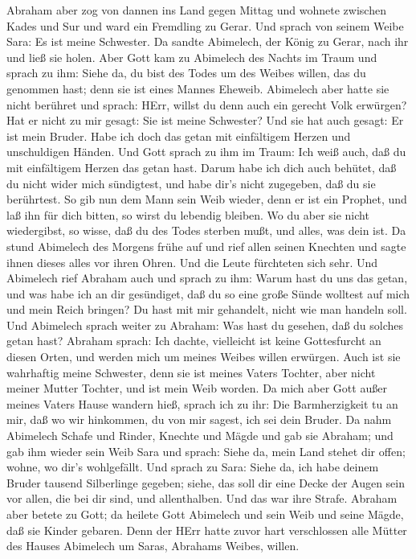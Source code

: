  Abraham aber zog von dannen ins Land gegen Mittag und
wohnete zwischen Kades und Sur und ward ein Fremdling zu Gerar.
 Und sprach von seinem Weibe Sara: Es ist meine Schwester.
Da sandte Abimelech, der König zu Gerar, nach ihr und ließ sie holen.
 Aber Gott kam zu Abimelech des Nachts im Traum und sprach
zu ihm: Siehe da, du bist des Todes um des Weibes willen, das du
genommen hast; denn sie ist eines Mannes Eheweib.  Abimelech
aber hatte sie nicht berühret und sprach: HErr, willst du denn auch ein
gerecht Volk erwürgen?  Hat er nicht zu mir gesagt: Sie ist
meine Schwester? Und sie hat auch gesagt: Er ist mein Bruder. Habe ich
doch das getan mit einfältigem Herzen und unschuldigen Händen.
 Und Gott sprach zu ihm im Traum: Ich weiß auch, daß du mit
einfältigem Herzen das getan hast. Darum habe ich dich auch behütet, daß
du nicht wider mich sündigtest, und habe dir's nicht zugegeben, daß du
sie berührtest.  So gib nun dem Mann sein Weib wieder, denn
er ist ein Prophet, und laß ihn für dich bitten, so wirst du lebendig
bleiben. Wo du aber sie nicht wiedergibst, so wisse, daß du des Todes
sterben mußt, und alles, was dein ist.  Da stund Abimelech
des Morgens frühe auf und rief allen seinen Knechten und sagte ihnen
dieses alles vor ihren Ohren. Und die Leute fürchteten sich sehr.
 Und Abimelech rief Abraham auch und sprach zu ihm: Warum
hast du uns das getan, und was habe ich an dir gesündiget, daß du so
eine große Sünde wolltest auf mich und mein Reich bringen? Du hast mit
mir gehandelt, nicht wie man handeln soll.  Und Abimelech
sprach weiter zu Abraham: Was hast du gesehen, daß du solches getan
hast?  Abraham sprach: Ich dachte, vielleicht ist keine
Gottesfurcht an diesen Orten, und werden mich um meines Weibes willen
erwürgen.  Auch ist sie wahrhaftig meine Schwester, denn
sie ist meines Vaters Tochter, aber nicht meiner Mutter Tochter, und ist
mein Weib worden.  Da mich aber Gott außer meines Vaters
Hause wandern hieß, sprach ich zu ihr: Die Barmherzigkeit tu an mir, daß
wo wir hinkommen, du von mir sagest, ich sei dein Bruder. 
Da nahm Abimelech Schafe und Rinder, Knechte und Mägde und gab sie
Abraham; und gab ihm wieder sein Weib Sara  und sprach:
Siehe da, mein Land stehet dir offen; wohne, wo dir's wohlgefällt.
 Und sprach zu Sara: Siehe da, ich habe deinem Bruder
tausend Silberlinge gegeben; siehe, das soll dir eine Decke der Augen
sein vor allen, die bei dir sind, und allenthalben. Und das war ihre
Strafe.  Abraham aber betete zu Gott; da heilete Gott
Abimelech und sein Weib und seine Mägde, daß sie Kinder gebaren.
 Denn der HErr hatte zuvor hart verschlossen alle Mütter
des Hauses Abimelech um Saras, Abrahams Weibes, willen.

